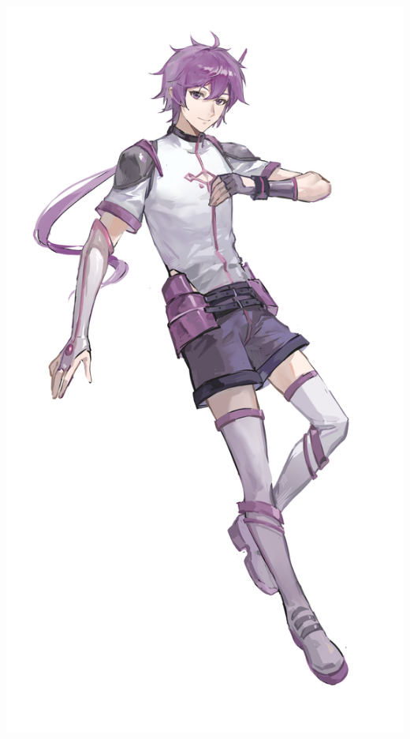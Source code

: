 \documentclass[twoside,12pt]{book}
\begin{document}
\begin{flushleft}
{\begin{minipage}[t]{0.35\textwidth}
{      \includegraphics[height=1.82\linewidth,width=\linewidth]{zijingfull.png}}
    \end{minipage}%
    }
    
  
\end{flushleft}
\end{document}
